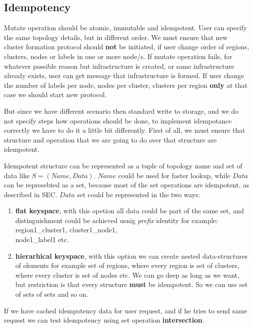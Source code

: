 \subsection{Idempotency}\label{sec:idempotency}
%
Mutate operation should be atomic, immutable and idempotent. User can specify the same topology details, but in different order. We must ensure that new cluster formation protocol should \textbf{not} be initiated, if user change order of regions, clusters, nodes or labels in one or more node/s. If mutate operation fails, for whatever possible reason but infrastructure is created, or same infrastructure already exists, user can get message that infrastructure is formed. If user change the number of labels per node, nodes per cluster, clusters per region \textbf{only} at that case we should start new protocol.

But since we have different scenario then standard write to storage, and we do not specify steps how operations should be done, to implement idempotance correctly we have to do it a little bit differently. First of all, we must ensure that structure and operation that we are going to do over that structure are idempotent.

Idempotent structure can be represented as a tuple of topology name and set of data like $S=(Name, Data)$. $Name$ could be used for faster lookup, while $Data$ can be represebted as a set, because most of the set operations are idempotent, as described in SEC. $Data$ set could be represented in the two ways:

\begin{enumerate}[start=1,label={(\bfseries \arabic*)}]
	\item \textbf{flat keyspace}, with this opetion all data could be part of the same set, and distinguishment could be achieved usnig \textit{prefix} identity for example: region1\_cluster1, cluster1\_node1, \\node1\_label1 etc.
	\item \textbf{hierarhical keyspace}, with this option we can create nested data-structures of elements for example set of regions, where every region is set of clusters, where every cluster is set of nodes etc. We can go deep as long as we want, but restriction is that every structure \textbf{must} be idempotent. So we can use set of sets of sets and so on.
\end{enumerate}

If we have cached idempotency data for user request, and if he tries to send same request we can test idempotency using set operation \textbf{intersection}.

